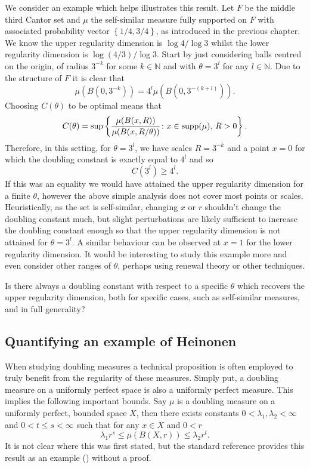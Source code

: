 We consider an example which helps illustrates this result. Let $F$ be the middle third Cantor set and $\mu$ the self-similar measure fully supported on $F$ with associated probability vector $\left\{ 1/4, 3/4 \right\}$, as introduced in the previous chapter. We know the upper regularity dimension is $\log 4 / \log 3$ whilst the lower regularity dimension is $\log(4/3) / \log 3$. Start by just considering balls centred on the origin, of radius $3^{-k}$ for some $k \in \mathbb{N}$ and with $\theta = 3^{l}$ for any $l \in \mathbb{N}$. Due to the structure of $F$ it is clear that 
\[
\mu(B(0, 3^{-k})) = 4^{l} \mu(B(0, 3^{-(k+l)})).
\]
Choosing $C(\theta)$ to be optimal means that 
\[
C(\theta) = \sup \left\{ \frac{\mu(B(x,R))}{\mu(B(x,R/\theta))} \colon x \in \textup{supp}(\mu), \, R > 0 \right\}.
\]
Therefore, in this setting, for $\theta = 3^l$, we have scales $R=3^{-k}$ and a point $x = 0$ for which the doubling constant is exactly equal to $4^l$ and so 
\[
C(3^{l}) \ge 4^l.
\] 
If this was an equality we would have attained the upper regularity dimension for a finite $\theta$, however the above simple analysis does not cover most points or scales. Heuristically, as the set is self-similar, changing $x$ or $r$ shouldn't change the doubling constant much, but slight perturbations are likely sufficient to increase the doubling constant enough so that the upper regularity dimension is not attained for $\theta = 3^l$. A similar behaviour can be observed at $x = 1$ for the lower regularity dimension. It would be interesting to study this example more and even consider other ranges of $\theta$, perhaps using renewal theory or other techniques.


\begin{question}
Is there always a doubling constant with respect to a specific $\theta$ which recovers the upper regularity dimension, both for specific cases, such as self-similar measures, and in full generality?
\end{question}


\subsection{Quantifying an example of Heinonen}\label{ch-quantifying:sec:quantifying}


When studying doubling measures a technical proposition is often employed to truly benefit from the regularity of these measures. Simply put, a doubling measure on a uniformly perfect space is also a uniformly perfect measure. This implies the following important bounds. Say $\mu$ is a doubling measure on a uniformly perfect, bounded space $X$, then there exists constants $0< \lambda_1, \lambda_2 < \infty$ and $0 < t \le s < \infty$ such that for any $x \in X$ and $0 < r$
\[
\lambda_1 r^s \le \mu(B(X,r)) \le \lambda_2 r^t.
\]
It is not clear where this was first stated, but the standard reference \cite{heinonen} provides this result as an example (\cite[Exercise 13.1]{heinonen}) without a proof. 

